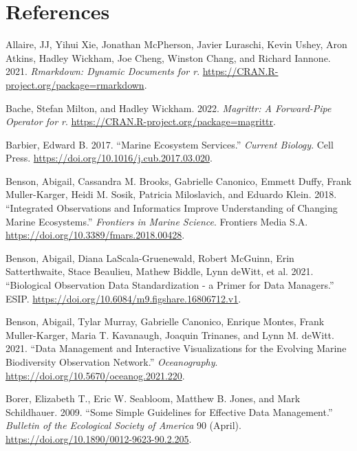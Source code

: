 \documentclass[
]{book}
\newlength{\cslhangindent}
\newlength{\cslentryspacingunit} %
\newenvironment{CSLReferences}[2] %
 {%
  \setlength{\parindent}{0pt}
  \ifodd #1
  \let\oldpar\par
  \def\par{\hangindent=\cslhangindent\oldpar}
  \fi
  \setlength{\parskip}{#2\cslentryspacingunit}
 }%
 {}
\begin{document}
\hypertarget{references}{%
\chapter*{References}\label{references}}

\hypertarget{refs}{}
\begin{CSLReferences}{1}{0}
\leavevmode{}%
Allaire, JJ, Yihui Xie, Jonathan McPherson, Javier Luraschi, Kevin Ushey, Aron Atkins, Hadley Wickham, Joe Cheng, Winston Chang, and Richard Iannone. 2021. \emph{Rmarkdown: Dynamic Documents for r}. \url{https://CRAN.R-project.org/package=rmarkdown}.

\leavevmode{}%
Bache, Stefan Milton, and Hadley Wickham. 2022. \emph{Magrittr: A Forward-Pipe Operator for r}. \url{https://CRAN.R-project.org/package=magrittr}.

\leavevmode{}%
Barbier, Edward B. 2017. {``Marine Ecosystem Services.''} \emph{Current Biology}. Cell Press. \url{https://doi.org/10.1016/j.cub.2017.03.020}.

\leavevmode{}%
Benson, Abigail, Cassandra M. Brooks, Gabrielle Canonico, Emmett Duffy, Frank Muller-Karger, Heidi M. Sosik, Patricia Miloslavich, and Eduardo Klein. 2018. {``Integrated Observations and Informatics Improve Understanding of Changing Marine Ecosystems.''} \emph{Frontiers in Marine Science}. Frontiers Media S.A. \url{https://doi.org/10.3389/fmars.2018.00428}.

\leavevmode{}%
Benson, Abigail, Diana LaScala-Gruenewald, Robert McGuinn, Erin Satterthwaite, Stace Beaulieu, Mathew Biddle, Lynn deWitt, et al. 2021. {``Biological Observation Data Standardization - a Primer for Data Managers.''} ESIP. \url{https://doi.org/10.6084/m9.figshare.16806712.v1}.

\leavevmode{}%
Benson, Abigail, Tylar Murray, Gabrielle Canonico, Enrique Montes, Frank Muller-Karger, Maria T. Kavanaugh, Joaquin Trinanes, and Lynn M. deWitt. 2021. {``Data Management and Interactive Visualizations for the Evolving Marine Biodiversity Observation Network.''} \emph{Oceanography}. \url{https://doi.org/10.5670/oceanog.2021.220}.

\leavevmode{}%
Borer, Elizabeth T., Eric W. Seabloom, Matthew B. Jones, and Mark Schildhauer. 2009. {``Some Simple Guidelines for Effective Data Management.''} \emph{Bulletin of the Ecological Society of America} 90 (April). \url{https://doi.org/10.1890/0012-9623-90.2.205}.


\end{CSLReferences}
\end{document}
